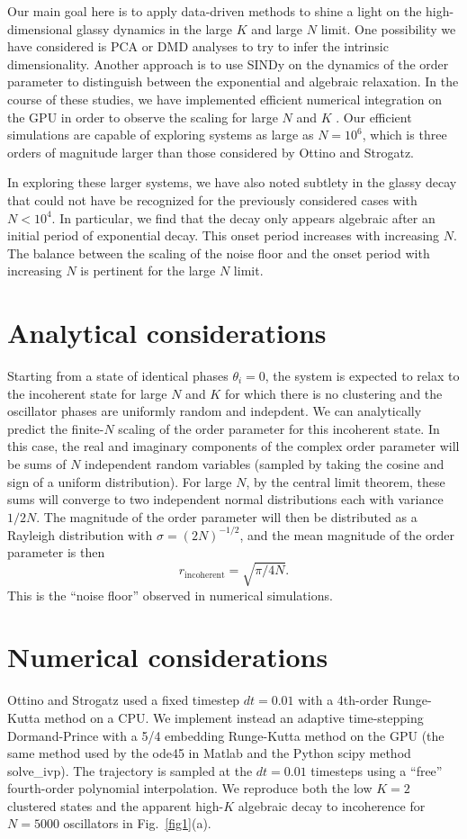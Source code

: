 \documentclass[aps,pre,amsmath,amssymb,floatfix,onecolumn,notitlepage,10pt]{revtex4-1}
\begin{document}
Our main goal here is to apply data-driven methods to shine a light on the high-dimensional glassy dynamics in the large $K$ and large $N$ limit. One possibility we have considered is PCA or DMD analyses to try to infer the intrinsic dimensionality.  Another approach is to use SINDy on the dynamics of the order parameter to distinguish between the exponential and algebraic relaxation.  In the course of these studies, we have implemented efficient numerical integration on the GPU in order to observe the scaling for large $N$ and $K$ \cite{github}. Our efficient simulations are capable of exploring systems as large as $N=10^6$,  which is three orders of magnitude larger than those considered by Ottino and Strogatz. 

In exploring these larger systems, we have also noted subtlety in the glassy decay that could not have be recognized for the previously considered cases with $N<10^4$. In particular, we find that the decay only appears algebraic after an initial period of exponential decay. This onset period increases with increasing $N$. The balance between the scaling of the noise floor and the onset period with increasing $N$ is pertinent for the large $N$ limit.

\section{Analytical considerations}
Starting from a state of identical phases $\theta_i=0$, the system is expected to relax to the incoherent state for large $N$ and $K$ for which there is no clustering and the oscillator phases are uniformly random and indepdent. We can analytically predict the finite-$N$ scaling of the order parameter for this incoherent state. In this case,  the real and imaginary components of the complex order parameter will be sums of $N$ independent random variables (sampled by taking the cosine and sign of a uniform distribution). For large $N$, by the central limit theorem, these sums will converge to two independent normal distributions each with variance $1/2N$. The magnitude of the order parameter will then be distributed as a Rayleigh distribution with $\sigma=(2N)^{-1/2}$, and the mean magnitude of the order parameter is then 
\begin{equation}
r_{\mathrm{incoherent}}=\sqrt{\pi/4N}.  \label{incoherent}
\end{equation}
This is the ``noise floor'' observed in numerical simulations.

\section{Numerical considerations}
Ottino and Strogatz  used a fixed timestep $dt=0.01$ with a 4th-order Runge-Kutta method on a CPU.  We implement instead an adaptive time-stepping Dormand-Prince with a 5/4 embedding Runge-Kutta method on the GPU (the same method used by the ode45 in Matlab and the Python scipy method solve\_ivp).  The trajectory is sampled at the $dt=0.01$ timesteps using a ``free'' fourth-order polynomial interpolation. We reproduce both the low $K=2$ clustered states and the apparent high-$K$ algebraic decay to incoherence for $N=5000$ oscillators in Fig.~\ref{fig1}(a).
\end{document}

